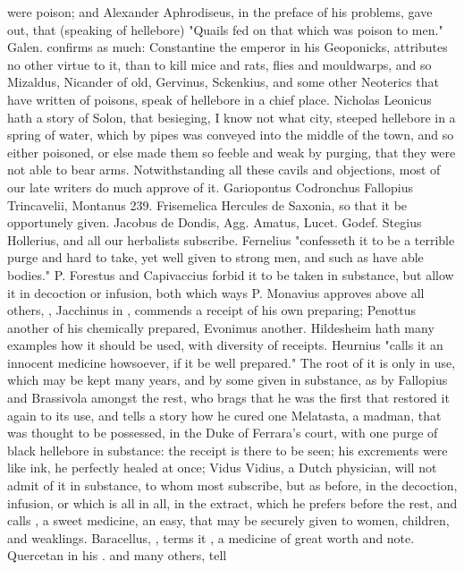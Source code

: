 {were poison; and Alexander Aphrodiseus, in the preface of his problems, gave out, that (speaking of hellebore) "Quails fed on that which was poison to men." Galen.  confirms as much: Constantine the emperor in his Geoponicks, attributes no other virtue to it, than to kill mice and rats, flies and mouldwarps, and so Mizaldus, Nicander of old, Gervinus, Sckenkius, and some other Neoterics that have written of poisons, speak of hellebore in a chief place. Nicholas Leonicus hath a story of Solon, that besieging, I know not what city, steeped hellebore in a spring of water, which by pipes was conveyed into the middle of the town, and so either poisoned, or else made them so feeble and weak by purging, that they were not able to bear arms. Notwithstanding all these cavils and objections, most of our late writers do much approve of it. Gariopontus  Codronchus  Fallopius  Trincavelii, Montanus 239. Frisemelica  Hercules de Saxonia, so that it be opportunely given. Jacobus de Dondis, Agg. Amatus, Lucet.  Godef. Stegius  Hollerius, and all our herbalists subscribe. Fernelius  "confesseth it to be a terrible purge and hard to take, yet well given to strong men, and such as have able bodies." P. Forestus and Capivaccius forbid it to be taken in substance, but allow it in decoction or infusion, both which ways P. Monavius approves above all others, , Jacchinus in , commends a receipt of his own preparing; Penottus another of his chemically prepared, Evonimus another. Hildesheim  hath many examples how it should be used, with diversity of receipts. Heurnius  "calls it an innocent medicine howsoever, if it be well prepared." The root of it is only in use, which may be kept many years, and by some given in substance, as by Fallopius and Brassivola amongst the rest, who brags that he was the first that restored it again to its use, and tells a story how he cured one Melatasta, a madman, that was thought to be possessed, in the Duke of Ferrara's court, with one purge of black hellebore in substance: the receipt is there to be seen; his excrements were like ink, he perfectly healed at once; Vidus Vidius, a Dutch physician, will not admit of it in substance, to whom most subscribe, but as before, in the decoction, infusion, or which is all in all, in the extract, which he prefers before the rest, and calls , a sweet medicine, an easy, that may be securely given to women, children, and weaklings. Baracellus, , terms it , a medicine of great worth and note. Quercetan in his . and many others, tell }
